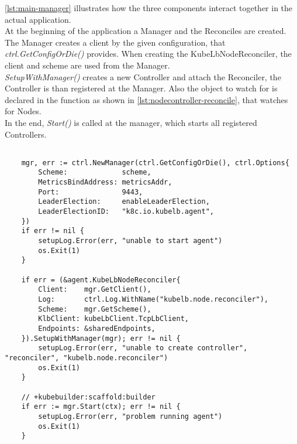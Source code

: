 \autoref{lst:main-manager} illustrates how the three components interact together in the actual application.
\\
At the beginning of the application a Manager and the Reconciles are created.
The Manager creates a client by the given configuration, that \textit{ctrl.GetConfigOrDie()} provides.
When creating the KubeLbNodeReconciler, the client and scheme are used from the Manager.
\\
\textit{SetupWithManager()} creates a new Controller and attach the Reconciler, the Controller is than registered at the Manager.
Also the object to watch for is declared in the function as shown in \autoref{lst:nodecontroller-reconcile}, that watches for Nodes.
\\
In the end, \textit{Start()} is called at the manager, which starts all registered Controllers.

\begin{lstlisting}[caption={KubeLB Agent main.go snippet - Manager and Controller}, label={lst:main-manager}]

	mgr, err := ctrl.NewManager(ctrl.GetConfigOrDie(), ctrl.Options{
		Scheme:             scheme,
		MetricsBindAddress: metricsAddr,
		Port:               9443,
		LeaderElection:     enableLeaderElection,
		LeaderElectionID:   "k8c.io.kubelb.agent",
	})
	if err != nil {
		setupLog.Error(err, "unable to start agent")
		os.Exit(1)
	}

	if err = (&agent.KubeLbNodeReconciler{
		Client:    mgr.GetClient(),
		Log:       ctrl.Log.WithName("kubelb.node.reconciler"),
		Scheme:    mgr.GetScheme(),
		KlbClient: kubeLbClient.TcpLbClient,
		Endpoints: &sharedEndpoints,
	}).SetupWithManager(mgr); err != nil {
		setupLog.Error(err, "unable to create controller", "reconciler", "kubelb.node.reconciler")
		os.Exit(1)
	}

	// +kubebuilder:scaffold:builder
	if err := mgr.Start(ctx); err != nil {
		setupLog.Error(err, "problem running agent")
		os.Exit(1)
	}


\end{lstlisting}

